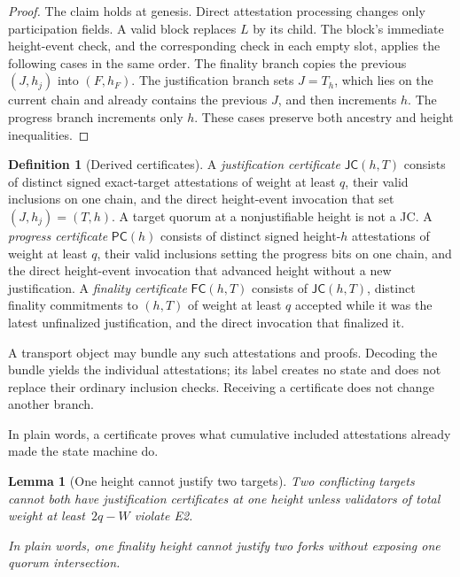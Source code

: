 \ifx\litemode\undefined\documentclass{article}\fi
\theoremstyle{plain}
\newtheorem{lemma}{Lemma}
\theoremstyle{definition}
\newtheorem{definition}{Definition}
\theoremstyle{remark}
\begin{document}
\begin{proof}
The claim holds at genesis.  Direct attestation processing changes only
participation fields.  A valid block replaces \(L\) by its child.
The block's immediate height-event check, and the corresponding check in
each empty slot, applies the following cases in the same order.
The finality branch copies the previous \((J,h_j)\) into \((F,h_F)\).
The justification branch sets \(J=T_h\), which lies on the current chain and
already contains the previous \(J\), and then increments \(h\).  The progress
branch increments only \(h\).  These cases preserve both ancestry and height
inequalities.
\end{proof}

\begin{definition}[Derived certificates]\label{def:certificates}
A \emph{justification certificate} \(\mathsf{JC}(h,T)\) consists of distinct
signed exact-target attestations of weight at least \(q\), their valid
inclusions on one chain, and the direct height-event invocation that set
\((J,h_j)=(T,h)\).  A target quorum at a nonjustifiable height is not a JC.
A \emph{progress certificate} \(\mathsf{PC}(h)\) consists of distinct signed
height-\(h\) attestations of weight at least \(q\), their valid inclusions
setting the progress bits on one chain, and the direct height-event invocation
that advanced height without a new justification.  A \emph{finality certificate}
\(\mathsf{FC}(h,T)\) consists of \(\mathsf{JC}(h,T)\), distinct finality
commitments to \((h,T)\) of weight at least \(q\) accepted while it was the
latest unfinalized justification, and the direct invocation that finalized it.

A transport object may bundle any such attestations and proofs.  Decoding the
bundle yields the individual attestations; its label creates no state and
does not replace their ordinary inclusion checks.  Receiving a certificate
does not change another branch.

In plain words, a certificate proves what cumulative included attestations
already made the state machine do.
\end{definition}

\begin{lemma}[One height cannot justify two targets]\label{lem:target-uniqueness}
Two conflicting targets cannot both have justification certificates at one
height unless validators of total weight at least~\(2q-W\) violate E2.

In plain words, one finality height cannot justify two forks without exposing
one quorum intersection.
\end{lemma}
\end{document}
